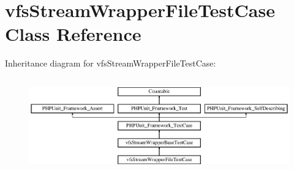 \hypertarget{classorg_1_1bovigo_1_1vfs_1_1vfs_stream_wrapper_file_test_case}{}\section{vfs\+Stream\+Wrapper\+File\+Test\+Case Class Reference}
\label{classorg_1_1bovigo_1_1vfs_1_1vfs_stream_wrapper_file_test_case}
Inheritance diagram for vfs\+Stream\+Wrapper\+File\+Test\+Case\+:\begin{figure}[H]
\begin{center}
\leavevmode
\includegraphics[height=4.129793cm]{classorg_1_1bovigo_1_1vfs_1_1vfs_stream_wrapper_file_test_case}
\end{center}
\end{figure}

